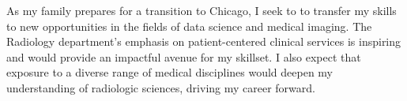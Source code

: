 As my family prepares for a transition to Chicago, I seek to to transfer my skills to
new opportunities in the fields of data science and medical imaging. The Radiology
department's emphasis on patient-centered clinical services is inspiring and would
provide an impactful avenue for my skillset. I also expect that exposure to a diverse
range of medical disciplines would deepen my understanding of radiologic sciences,
driving my career forward.